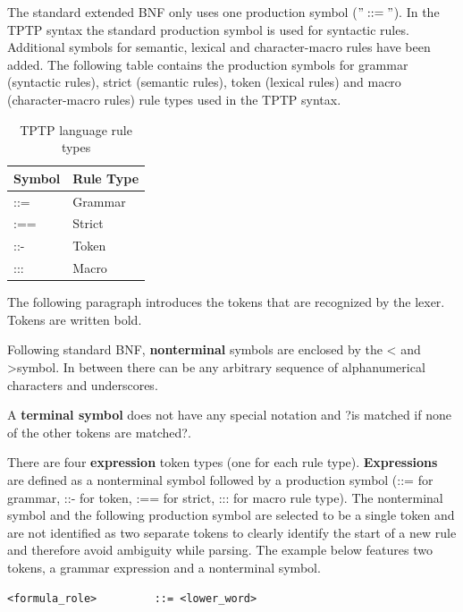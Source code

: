 The standard extended BNF only uses one production symbol ($"::="$).
In the TPTP syntax the standard production symbol is used for syntactic rules.
Additional symbols for semantic, lexical and character-macro rules have been added.
The following table contains the production symbols for grammar (syntactic rules), strict (semantic rules), token (lexical rules) and macro (character-macro rules) rule types used in the TPTP syntax.

\begin{table}[H]
\centering
\renewcommand{\arraystretch}{1}
\caption{\ac{TPTP} language rule types \cite{VS06}}
\begin{tabular}{ll}
\textbf{Symbol} & \textbf{Rule Type}\\\hline
::= & Grammar\\
:== & Strict\\
::- & Token\\
::: & Macro\\
\end{tabular}
\label{tbl:ConceptTPTPProductionSymbols}
\end{table}

The following paragraph introduces the tokens that are recognized by the lexer. Tokens are written bold.

Following standard BNF, \textbf{nonterminal} symbols are enclosed by the \textless\; and \textgreater \;symbol.
In between there can be any arbitrary sequence of alphanumerical characters and underscores.

A \textbf{terminal symbol} does not have any special notation and ?is matched if none of the other tokens are matched?.

There are four \textbf{expression} token types (one for each rule type).
\textbf{Expressions} are defined as a nonterminal symbol followed by a production symbol (::= for grammar, ::- for token, :== for strict, ::: for macro rule type).
The nonterminal symbol and the following production symbol are selected to be a single token and are not identified as two separate tokens to clearly identify the start of a new rule and therefore avoid ambiguity while parsing.
The example below features two tokens, a grammar expression and a nonterminal symbol.
\begin{verbatim}
<formula_role>         ::= <lower_word>
\end{verbatim}

